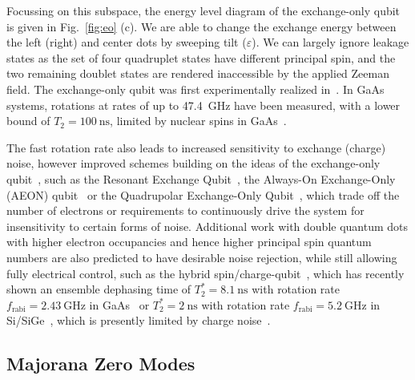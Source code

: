Focussing on this subspace, the energy level diagram of the exchange-only qubit is given in Fig.~\ref{fig:eo} (c). We are able to change the exchange
energy between the left (right) and center dots by sweeping tilt ($\varepsilon$). We can largely ignore leakage states as the set of four quadruplet
states have different principal spin, and the two remaining doublet states are rendered inaccessible by the applied Zeeman field. The exchange-only
qubit was first experimentally realized in~\cite{PhysRevB.82.075403}. In GaAs systems, rotations at rates of up to \SI{47.4}{\giga\hertz} have been measured,
with a lower bound of $T_2 = \SI{100}{\nano\second}$, limited by nuclear spins in GaAs~\cite{nnano.2013.168}.

The fast rotation rate also leads to increased sensitivity to exchange (charge) noise, however improved schemes building
on the ideas of the exchange-only qubit~\cite{Russ_2017}, such as the Resonant Exchange Qubit~\cite{PhysRevLett.111.050501},
the Always-On Exchange-Only (AEON) qubit~\cite{PhysRevB.93.121410} or the Quadrupolar Exchange-Only Qubit~\cite{PhysRevLett.121.177701,Kornich_2018},
which trade off the number of electrons or requirements to continuously drive the system for insensitivity to certain forms of noise.
Additional work with double quantum dots with higher electron occupancies and hence higher principal spin quantum numbers are also
predicted to have desirable noise rejection, while still allowing fully electrical control, such as the hybrid
spin/charge-qubit~\cite{PhysRevLett.108.140503}, which has recently shown an ensemble dephasing time
of $T_2^* = \SI{8.1}{\nano\second}$ with rotation rate $f_{\textrm{rabi}} = \SI{2.43}{\giga\hertz}$ in
GaAs~\cite{PhysRevLett.116.086801} or $T_2^* = \SI{2}{\nano\second}$ with rotation rate $f_{\textrm{rabi}} = \SI{5.2}{\giga\hertz}$ in
Si/SiGe~\cite{nature13407}, which is presently limited by charge noise~\cite{s41534-017-0034-2}.

\subsection{Majorana Zero Modes}
\label{sec:majo}

